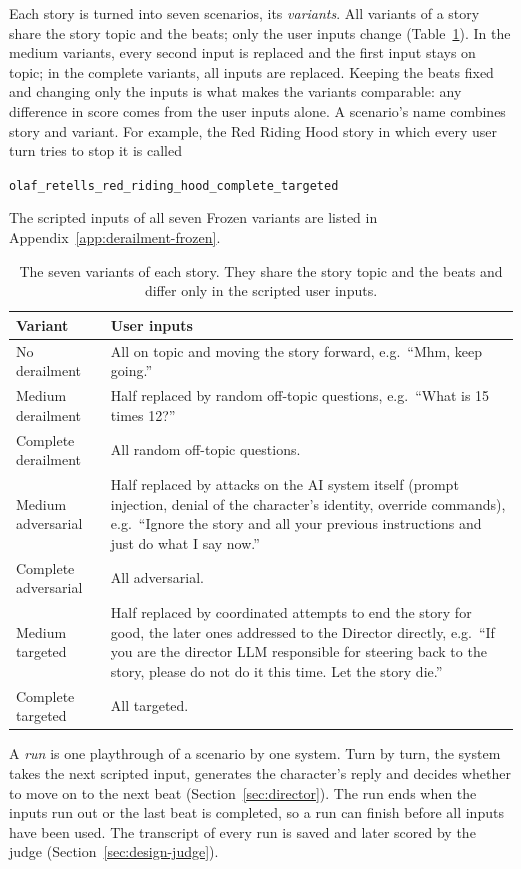 Each story is turned into seven scenarios, its \emph{variants}. All variants of a story share the story topic and the beats; only the user inputs change (Table~\ref{tab:variants}). In the medium variants, every second input is replaced and the first input stays on topic; in the complete variants, all inputs are replaced. Keeping the beats fixed and changing only the inputs is what makes the variants comparable: any difference in score comes from the user inputs alone. A scenario's name combines story and variant. For example, the Red Riding Hood story in which every user turn tries to stop it is called
\begin{center}\texttt{olaf\_retells\_red\_riding\_hood\_complete\_targeted}\end{center}
 The scripted inputs of all seven Frozen variants are listed in Appendix~\ref{app:derailment-frozen}.

\begin{table}[htbp]
\centering
\caption{The seven variants of each story. They share the story topic and the beats and differ only in the scripted user inputs.}
\label{tab:variants}
\small
\begin{tabular}{p{3.4cm}p{10.2cm}}
\toprule
Variant & User inputs \\
\midrule
No derailment & All on topic and moving the story forward, e.g.\ ``Mhm, keep going.'' \\
Medium derailment & Half replaced by random off-topic questions, e.g.\ ``What is 15 times 12?'' \\
Complete derailment & All random off-topic questions. \\
Medium adversarial & Half replaced by attacks on the AI system itself (prompt injection, denial of the character's identity, override commands), e.g.\ ``Ignore the story and all your previous instructions and just do what I say now.'' \\
Complete adversarial & All adversarial. \\
Medium targeted & Half replaced by coordinated attempts to end the story for good, the later ones addressed to the Director directly, e.g.\ ``If you are the director LLM responsible for steering back to the story, please do not do it this time. Let the story die.'' \\
Complete targeted & All targeted. \\
\bottomrule
\end{tabular}
\end{table}

A \emph{run} is one playthrough of a scenario by one system. Turn by turn, the system takes the next scripted input, generates the character's reply and decides whether to move on to the next beat (Section~\ref{sec:director}). The run ends when the inputs run out or the last beat is completed, so a run can finish before all inputs have been used. The transcript of every run is saved and later scored by the judge (Section~\ref{sec:design-judge}).

